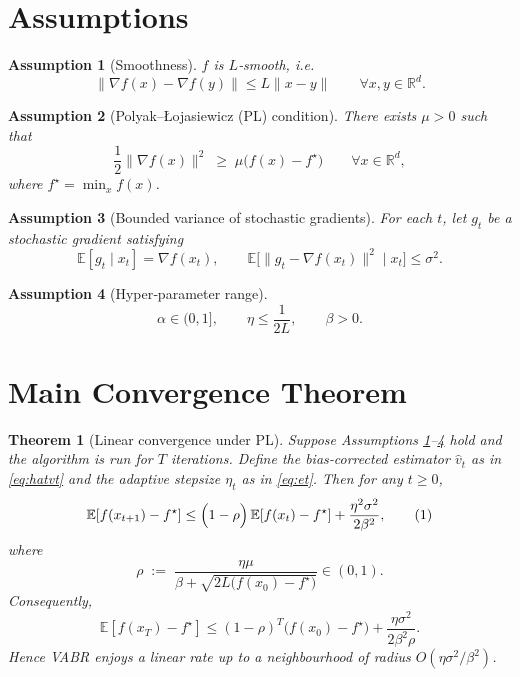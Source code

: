 \documentclass{article}
\newtheorem{theorem}{Theorem}
\newtheorem{assumption}{Assumption}
\newcommand{\E}{\mathbb{E}}
\newcommand{\R}{\mathbb{R}}
\begin{document}
\section{Assumptions}
\begin{assumption}[Smoothness]\label{ass:smooth}
$f$ is $L$‑smooth, i.e.
\[
\|\nabla f(x)-\nabla f(y)\|\le L\|x-y\|\qquad\forall x,y\in\R^{d}.
\]
\end{assumption}
\begin{assumption}[Polyak–Łojasiewicz (PL) condition]\label{ass:pl}
There exists $\mu>0$ such that
\[
\frac12\|\nabla f(x)\|^{2}\;\ge\;\mu\bigl(f(x)-f^{\star}\bigr)\qquad\forall x\in\R^{d},
\]
where $f^{\star}= \min_{x}f(x)$.
\end{assumption}
\begin{assumption}[Bounded variance of stochastic gradients]\label{ass:var}
For each $t$, let $g_t$ be a stochastic gradient satisfying
\[
\E[g_t\mid x_t]=\nabla f(x_t),\qquad 
\E\bigl[\|g_t-\nabla f(x_t)\|^{2}\mid x_t\bigr]\le\sigma^{2}.
\]
\end{assumption}
\begin{assumption}[Hyper‑parameter range]\label{ass:hp}
\[
\alpha\in(0,1],\qquad \eta\le\frac{1}{2L},\qquad \beta>0.
\]
\end{assumption}

\section{Main Convergence Theorem}
\begin{theorem}[Linear convergence under PL]\label{thm:linear}
Suppose Assumptions \ref{ass:smooth}–\ref{ass:hp} hold and the algorithm is run for $T$ iterations.  
Define the bias‑corrected estimator $\hat v_t$ as in \eqref{eq:hatvt} and the adaptive stepsize $\eta_t$ as in \eqref{eq:et}.  
Then for any $t\ge0$,
\[
\E\!\left[f(x_{t+1})-f^{\star}\right]\le\Bigl(1-\rho\Bigr)\,\E\!\left[f(x_{t})-f^{\star}\right]+\frac{\eta^{2}\sigma^{2}}{2\beta^{2}},
\tag{1}
\]
where
\[
\rho\;:=\;\frac{\eta\mu}{\beta+ \sqrt{2L\bigl(f(x_{0})-f^{\star}\bigr)} } \in (0,1).
\]
Consequently,
\[
\E\!\left[f(x_{T})-f^{\star}\right]\le (1-\rho)^{T}\bigl(f(x_{0})-f^{\star}\bigr)+\frac{\eta\sigma^{2}}{2\beta^{2}\rho}.
\tag{2}
\]
Hence VABR enjoys a linear rate up to a neighbourhood of radius $O(\eta\sigma^{2}/\beta^{2})$.
\end{theorem}
\end{document}
